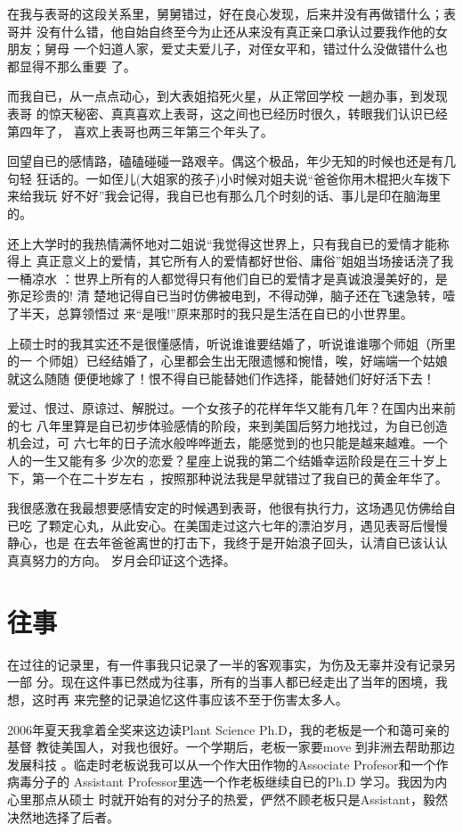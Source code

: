 \documentclass[12pt]{book}
\begin{document}
在我与表哥的这段关系里，舅舅错过，好在良心发现，后来并没有再做错什么；表哥并
没有什么错，他自始自终至今为止还从来没有真正亲口承认过要我作他的女朋友；舅母
一个妇道人家，爱丈夫爱儿子，对侄女平和，错过什么没做错什么也都显得不那么重要
了。

而我自已，从一点点动心，到大表姐掐死火星，从正常回学校 一趟办事，到发现表哥
的惊天秘密、真真喜欢上表哥，这之间也已经历时很久，转眼我们认识已经第四年了，
喜欢上表哥也两三年第三个年头了。

回望自已的感情路，磕磕碰碰一路艰辛。偶这个极品，年少无知的时候也还是有几句轻
狂话的。一如侄儿(大姐家的孩子)小时候对姐夫说“爸爸你用木棍把火车拨下来给我玩
好不好”我会记得，我自已也有那么几个时刻的话、事儿是印在脑海里的。

还上大学时的我热情满怀地对二姐说“我觉得这世界上，只有我自已的爱情才能称得上
真正意义上的爱情，其它所有人的爱情都好世俗、庸俗”姐姐当场接话浇了我一桶凉水
：世界上所有的人都觉得只有他们自已的爱情才是真诚浪漫美好的，是弥足珍贵的! 清
楚地记得自已当时仿佛被电到，不得动弹，脑子还在飞速急转，噎了半天，总算领悟过
来“是哦!”原来那时的我只是生活在自已的小世界里。

上硕士时的我其实还不是很懂感情，听说谁谁要结婚了，听说谁谁哪个师姐（所里的一
个师姐）已经结婚了，心里都会生出无限遗憾和惋惜，唉，好端端一个姑娘就这么随随
便便地嫁了！恨不得自已能替她们作选择，能替她们好好活下去！

爱过、恨过、原谅过、解脱过。一个女孩子的花样年华又能有几年？在国内出来前的七
八年里算是自已初步体验感情的阶段，来到美国后努力地找过，为自已创造机会过，可
六七年的日子流水般哗哗逝去，能感觉到的也只能是越来越难。一个人的一生又能有多
少次的恋爱？星座上说我的第二个结婚幸运阶段是在三十岁上下，第一个在二十岁左右
，按照那种说法我是早就错过了我自已的黄金年华了。

我很感激在我最想要感情安定的时候遇到表哥，他很有执行力，这场遇见仿佛给自已吃
了颗定心丸，从此安心。在美国走过这六七年的漂泊岁月，遇见表哥后慢慢静心，也是
在去年爸爸离世的打击下，我终于是开始浪子回头，认清自已该认认真真努力的方向。
岁月会印证这个选择。
\section{往事}
\label{sec-12-8}

在过往的记录里，有一件事我只记录了一半的客观事实，为伤及无辜并没有记录另一部
分。现在这件事已然成为往事，所有的当事人都已经走出了当年的困境，我想，这时再
来完整的记录追忆这件事应该不至于伤害太多人。

2006年夏天我拿着全奖来这边读Plant Science Ph.D，我的老板是一个和蔼可亲的基督
教徒美国人，对我也很好。一个学期后，老板一家要move 到非洲去帮助那边发展科技
。临走时老板说我可以从一个作大田作物的Associate Profesor和一个作病毒分子的
Assistant Professor里选一个作老板继续自已的Ph.D 学习。我因为内心里那点从硕士
时就开始有的对分子的热爱，俨然不顾老板只是Assistant，毅然决然地选择了后者。
\end{document}
